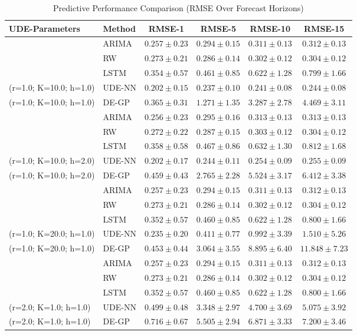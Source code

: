 \documentclass[openacc]{rsproca_new}%
\begin{document}
\begin{table}[H]
\centering
\caption{Predictive Performance Comparison (RMSE Over Forecast Horizons)}
\label{tab:params_x}
\small
\begin{tabular}{llcccc}
\hline
\textbf{UDE-Parameters} & \textbf{Method} & \textbf{RMSE-1} & \textbf{RMSE-5} & \textbf{RMSE-10} & \textbf{RMSE-15} \\ \hline
& ARIMA & $0.257 \pm 0.23$ & $0.294 \pm 0.15$ & $0.311 \pm 0.13$ & $0.312 \pm 0.13$ \\
& RW    & $0.273 \pm 0.21$ & $0.286 \pm 0.14$ & $0.302 \pm 0.12$ & $0.304 \pm 0.12$ \\
& LSTM  & $0.354 \pm 0.57$ & $0.461 \pm 0.85$ & $0.622 \pm 1.28$ & $0.799 \pm 1.66$ \\
(r=1.0; K=10.0; h=1.0) & UDE-NN & $0.202 \pm 0.15$ & $0.237 \pm 0.10$ & $0.241 \pm 0.08$ & $0.244 \pm 0.08$ \\
(r=1.0; K=10.0; h=1.0) & DE-GP     & $0.365 \pm 0.31$ & $1.271 \pm 1.35$ & $3.287 \pm 2.78$ & $4.469 \pm 3.11$ \\ \hline
& ARIMA & $0.256 \pm 0.23$ & $0.295 \pm 0.16$ & $0.313 \pm 0.13$ & $0.313 \pm 0.13$ \\
& RW    & $0.272 \pm 0.22$ & $0.287 \pm 0.15$ & $0.303 \pm 0.12$ & $0.304 \pm 0.12$ \\
& LSTM  & $0.358 \pm 0.58$ & $0.467 \pm 0.86$ & $0.632 \pm 1.30$ & $0.812 \pm 1.68$ \\
(r=1.0; K=10.0; h=2.0) & UDE-NN & $0.202 \pm 0.17$ & $0.244 \pm 0.11$ & $0.254 \pm 0.09$ & $0.255 \pm 0.09$ \\
(r=1.0; K=10.0; h=2.0) & DE-GP     & $0.459 \pm 0.43$ & $2.765 \pm 2.28$ & $5.524 \pm 3.17$ & $6.412 \pm 3.38$ \\ \hline
& ARIMA & $0.257 \pm 0.23$ & $0.294 \pm 0.15$ & $0.311 \pm 0.13$ & $0.312 \pm 0.13$ \\
& RW    & $0.273 \pm 0.21$ & $0.286 \pm 0.14$ & $0.302 \pm 0.12$ & $0.304 \pm 0.12$ \\
& LSTM  & $0.352 \pm 0.57$ & $0.460 \pm 0.85$ & $0.622 \pm 1.28$ & $0.800 \pm 1.66$ \\
(r=1.0; K=20.0; h=1.0) & UDE-NN & $0.235 \pm 0.20$ & $0.411 \pm 0.77$ & $0.992 \pm 3.39$ & $1.510 \pm 5.26$ \\
(r=1.0; K=20.0; h=1.0) & DE-GP     & $0.453 \pm 0.44$ & $3.064 \pm 3.55$ & $8.895 \pm 6.40$ & $11.848 \pm 7.23$ \\ \hline
& ARIMA & $0.257 \pm 0.23$ & $0.294 \pm 0.15$ & $0.311 \pm 0.13$ & $0.312 \pm 0.13$ \\
& RW    & $0.273 \pm 0.21$ & $0.286 \pm 0.14$ & $0.302 \pm 0.12$ & $0.304 \pm 0.12$ \\
& LSTM  & $0.352 \pm 0.57$ & $0.460 \pm 0.85$ & $0.622 \pm 1.28$ & $0.800 \pm 1.66$ \\
(r=2.0; K=1.0; h=1.0) & UDE-NN & $0.499 \pm 0.48$ & $3.348 \pm 2.97$ & $4.700 \pm 3.69$ & $5.075 \pm 3.92$ \\
(r=2.0; K=1.0; h=1.0) & DE-GP     & $0.716 \pm 0.67$ & $5.505 \pm 2.94$ & $6.871 \pm 3.33$ & $7.200 \pm 3.46$ \\ \hline
\end{tabular}
\end{table}
\end{document}

